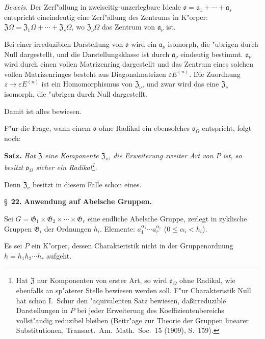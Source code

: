 \documentclass[12pt,a4paper]{article}
\theoremstyle{plain}
\begin{document}
\noindent\textit{Beweis.}
Der Zerf"allung in zweiseitig-unzerlegbare Ideale $\mathfrak{o} = \mathfrak{a}_1 + \cdots + \mathfrak{a}_s$ entspricht eineindeutig eine Zerf"allung des Zentrums in K"orper: $\mathfrak{Z}\Omega = \mathfrak{Z}_1\Omega + \cdots + \mathfrak{Z}_s\Omega$, wo $\mathfrak{Z}_\nu\Omega$ das Zentrum von $\mathfrak{a}_\nu$ ist.

Bei einer irreduziblen Darstellung von $\mathfrak{o}$ wird ein $\mathfrak{a}_\nu$ isomorph, die "ubrigen durch Null dargestellt, und die Darstellungsklasse ist durch $\mathfrak{a}_\nu$ eindeutig bestimmt. $\mathfrak{a}_\nu$ wird durch einen vollen Matrizenring dargestellt und das Zentrum eines solchen vollen Matrizenringes besteht aus Diagonalmatrizen $\varepsilon E^{(n)}$. Die Zuordnung $z \to \varepsilon E^{(n)}$ ist ein Homomorphismus von $\mathfrak{Z}_\nu$, und zwar wird das eine $\mathfrak{Z}_\nu$ isomorph, die "ubrigen durch Null dargestellt.

Damit ist alles bewiesen.

F"ur die Frage, wann einem $\mathfrak{o}$ ohne Radikal ein ebensolches $\mathfrak{o}_\Omega$ entspricht, folgt noch:

\medskip\noindent\textbf{Satz.}
\textit{Hat $\mathfrak{Z}$ eine Komponente $\mathfrak{Z}_\nu$, die Erweiterung zweiter Art von $P$ ist, so besitzt $\mathfrak{o}_\Omega$ sicher ein Radikal\footnote{Hat $\mathfrak{Z}$ nur Komponenten von erster Art, so wird $\mathfrak{o}_\Omega$ ohne Radikal, wie ebenfalls an sp"aterer Stelle bewiesen werden soll. F"ur Charakteristik Null hat schon I.\ Schur den "aquivalenten Satz bewiesen, da\ss irreduzible Darstellungen in $P$ bei jeder Erweiterung des Koeffizientenbereichs vollst"andig reduzibel bleiben (Beitr"age zur Theorie der Gruppen linearer Substitutionen, Transact.\ Am.\ Math.\ Soc.\ 15 (1909), S.\ 159).}.}

Denn $\mathfrak{Z}_\nu$ besitzt in diesem Falle schon eines.

\newpage
\S~\textbf{22.}
\textbf{Anwendung auf Abelsche Gruppen.}

\smallskip

\noindent
Sei $G = \mathfrak{G}_1 \times \mathfrak{G}_2 \times \cdots \times \mathfrak{G}_r$ eine endliche Abelsche Gruppe, zerlegt in zyklische Gruppen $\mathfrak{G}_i$ der Ordnungen $h_i$. Elemente: $a_1^{\alpha_1} \cdots a_r^{\alpha_r}$ ($0 \leq \alpha_i < h_i$).

Es sei $P$ ein K"orper, dessen Charakteristik nicht in der Gruppenordnung $h = h_1 h_2 \cdots h_r$ aufgeht.
\end{document}
